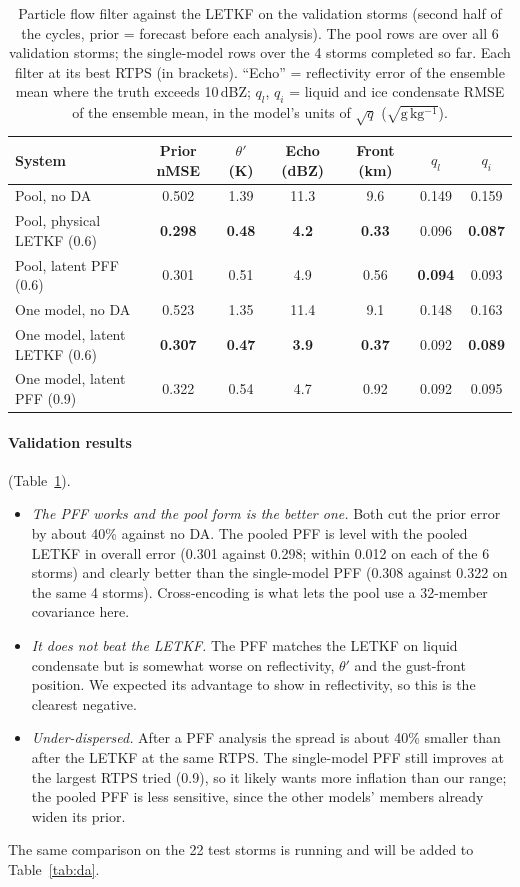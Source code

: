 \documentclass[11pt]{article}
\begin{document}
\begin{table}[ht]
\centering\small
\caption{Particle flow filter against the LETKF on the validation storms (second half of the cycles, prior = forecast before each analysis). The pool rows are over all 6 validation storms; the single-model rows over the 4 storms completed so far. Each filter at its best RTPS (in brackets). ``Echo'' = reflectivity error of the ensemble mean where the truth exceeds 10\,dBZ; $q_l$, $q_i$ = liquid and ice condensate RMSE of the ensemble mean, in the model's units of $\sqrt{q}$ ($\sqrt{\mathrm{g\,kg^{-1}}}$).}
\label{tab:pff}
\begin{tabular}{lcccccc}
\toprule
System & Prior nMSE & $\theta'$ (K) & Echo (dBZ) & Front (km) & $q_l$ & $q_i$ \\
\midrule
Pool, no DA & 0.502 & 1.39 & 11.3 & 9.6 & 0.149 & 0.159 \\
Pool, physical LETKF (0.6) & \textbf{0.298} & \textbf{0.48} & \textbf{4.2} & \textbf{0.33} & 0.096 & \textbf{0.087} \\
Pool, latent PFF (0.6) & 0.301 & 0.51 & 4.9 & 0.56 & \textbf{0.094} & 0.093 \\
\midrule
One model, no DA & 0.523 & 1.35 & 11.4 & 9.1 & 0.148 & 0.163 \\
One model, latent LETKF (0.6) & \textbf{0.307} & \textbf{0.47} & \textbf{3.9} & \textbf{0.37} & 0.092 & \textbf{0.089} \\
One model, latent PFF (0.9) & 0.322 & 0.54 & 4.7 & 0.92 & 0.092 & 0.095 \\
\bottomrule
\end{tabular}
\end{table}

\paragraph{Validation results} (Table~\ref{tab:pff}).
\begin{itemize}
\item \emph{The PFF works and the pool form is the better one.} Both cut the prior error by about 40\% against no DA. The pooled PFF is level with the pooled LETKF in overall error (0.301 against 0.298; within 0.012 on each of the 6 storms) and clearly better than the single-model PFF (0.308 against 0.322 on the same 4 storms). Cross-encoding is what lets the pool use a 32-member covariance here.
\item \emph{It does not beat the LETKF.} The PFF matches the LETKF on liquid condensate but is somewhat worse on reflectivity, $\theta'$ and the gust-front position. We expected its advantage to show in reflectivity, so this is the clearest negative.
\item \emph{Under-dispersed.} After a PFF analysis the spread is about 40\% smaller than after the LETKF at the same RTPS. The single-model PFF still improves at the largest RTPS tried (0.9), so it likely wants more inflation than our range; the pooled PFF is less sensitive, since the other models' members already widen its prior.
\end{itemize}
The same comparison on the 22 test storms is running and will be added to Table~\ref{tab:da}.
\end{document}
